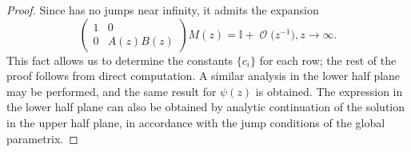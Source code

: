 \documentclass[pdftex]{sigma}
\DeclareMathOperator{\OO}{\mathcal{O}}
\numberwithin{equation}{section}
\begin{document}
\begin{proof}
Since  has no jumps near infinity, it admits the expansion
 \begin{equation*}
 \begin{pmatrix}
 1 & 0\\
 0 & A(z)B(z)
 \end{pmatrix} M(z) = \mathbb{I} + \OO\bigl(z^{-1}\bigr), z\to \infty.
 \end{equation*}
This fact allows us to determine the constants $\{c_i\}$ for each row; the rest of the proof follows from direct computation. A similar analysis in the lower half plane may be performed, and the same result for $\psi(z)$ is obtained. The expression in the lower half plane can also be obtained by analytic continuation of the solution in the upper half plane, in accordance with the jump conditions of the global parametrix.
\end{proof}
\end{document}
